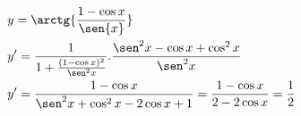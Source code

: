 \begin{ex}
\begin{align}
&y=\arctg{\frac{1-\cos{x}}{\sen{x}}}\nonumber\\
&y'=\frac{1}{1+\frac{(1-\cos{x})^2}{\sen^2{x}}}.\frac{\sen^2{x}-\cos{x}+\cos^2{x}}{\sen^2{x}}\nonumber\\
&y'=\frac{1-\cos{x}}{\sen^2{x}+\cos^2{x}-2\cos{x}+1}=\frac{1-\cos{x}}{2-2\cos{x}}=\frac{1}{2}\nonumber
\end{align}
\end{ex}